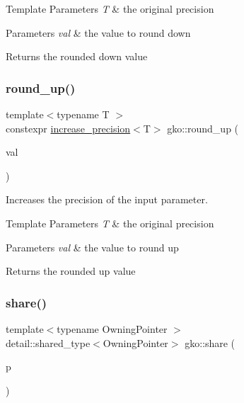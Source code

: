 \begin{DoxyTemplParams}{Template Parameters}
{\em T} & the original precision\\
\hline
\end{DoxyTemplParams}

\begin{DoxyParams}{Parameters}
{\em val} & the value to round down\\
\hline
\end{DoxyParams}
\begin{DoxyReturn}{Returns}
the rounded down value 
\end{DoxyReturn}
\mbox{\label{namespacegko_ad45d1c855f31d2f8c1d3d799f2cf21c6}} 
\subsubsection{\texorpdfstring{round\+\_\+up()}{round\_up()}}
{\footnotesize\ttfamily template$<$typename T $>$ \\
constexpr \hyperlink{namespacegko_a373c2b4782d95e675d7e91a75bab101d}{increase\+\_\+precision}$<$T$>$ gko\+::round\+\_\+up (\begin{DoxyParamCaption}\item[{T}]{val }\end{DoxyParamCaption})\hspace{0.3cm}{\ttfamily [inline]}}



Increases the precision of the input parameter. 


\begin{DoxyTemplParams}{Template Parameters}
{\em T} & the original precision\\
\hline
\end{DoxyTemplParams}

\begin{DoxyParams}{Parameters}
{\em val} & the value to round up\\
\hline
\end{DoxyParams}
\begin{DoxyReturn}{Returns}
the rounded up value 
\end{DoxyReturn}
\mbox{\label{namespacegko_a3ce296f73db0ff398bdea6009a3a5c58}} 
\subsubsection{\texorpdfstring{share()}{share()}}
{\footnotesize\ttfamily template$<$typename Owning\+Pointer $>$ \\
detail\+::shared\+\_\+type$<$Owning\+Pointer$>$ gko\+::share (\begin{DoxyParamCaption}\item[{Owning\+Pointer \&\&}]{p }\end{DoxyParamCaption})\hspace{0.3cm}{\ttfamily [inline]}}



